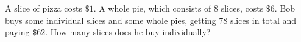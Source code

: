 A slice of pizza costs $\$1$. A whole pie, which consists of $8$ slices, costs $\$6$. Bob buys some individual slices and some whole pies, getting $78$ slices in total and paying $\$62$. How many slices does he buy individually?
